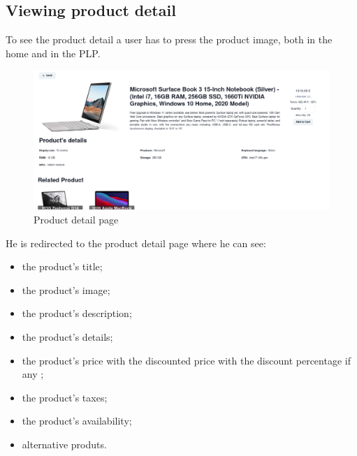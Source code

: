\subsection{Viewing product detail}
To see the product detail a user has to press the product image, both in the home and in the PLP.
\begin{figure}[!ht]
    \caption{Product detail page}
    \vspace{10px}
    \includegraphics[scale=0.2]{../../../../Images/userManual/PDP.png}
    \centering
\end{figure}
He is redirected to the product detail page where he can see:
\begin{itemize}
    \item the product's title;
    \item the product's image;
    \item the product's description;
    \item the product's details;
    \item the product's price with the discounted price with the discount percentage if any ;
    \item the product's taxes;
    \item the product's availability;
    \item alternative produts.
\end{itemize}
